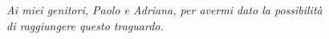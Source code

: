 \vspace*{3.5cm}

\large
\begin{flushright}
\itshape{Ai miei genitori, Paolo e Adriana, per avermi dato la possibilità\\di raggiungere questo traguardo.}
\end{flushright}
